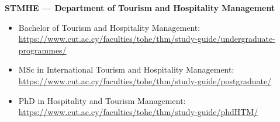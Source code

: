 \documentclass[11pt,a4paper]{article}
\begin{document}
\textbf{STMHE --- Department of Tourism and Hospitality Management}
\begin{itemize}
  \item Bachelor of Tourism and Hospitality Management: \url{https://www.cut.ac.cy/faculties/tohe/thm/study-guide/undergraduate-programmes/}
  \item MSc in International Tourism and Hospitality Management: \url{https://www.cut.ac.cy/faculties/tohe/thm/study-guide/postgraduate/}
  \item PhD in Hospitality and Tourism Management: \url{https://www.cut.ac.cy/faculties/tohe/thm/study-guide/phdHTM/}
\end{itemize}
\end{document}
